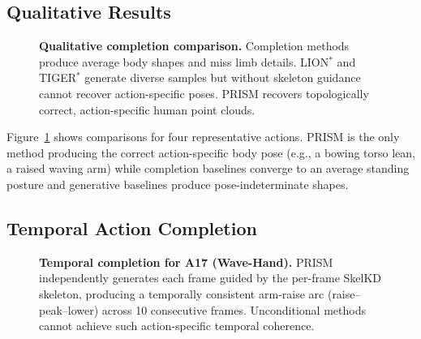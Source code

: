 \documentclass{article}
\begin{document}
\subsection{Qualitative Results}
\label{sec:qual}

\begin{figure}[t]
  \centering
  \caption{
    \textbf{Qualitative completion comparison.}
    Completion methods produce average body shapes and miss limb details.
    LION$^*$ and TIGER$^*$ generate diverse samples but without skeleton
    guidance cannot recover action-specific poses.
    PRISM recovers topologically correct, action-specific human point clouds.
  }
  \label{fig:qual}
\end{figure}

Figure~\ref{fig:qual} shows comparisons for four representative actions.
PRISM is the only method producing the correct action-specific body pose
(e.g., a bowing torso lean, a raised waving arm) while completion baselines
converge to an average standing posture and generative baselines produce
pose-indeterminate shapes.

\subsection{Temporal Action Completion}
\label{sec:temporal}

\begin{figure}[t]
  \centering
  \caption{
    \textbf{Temporal completion for A17 (Wave-Hand).}
    PRISM independently generates each frame guided by the per-frame SkelKD
    skeleton, producing a temporally consistent arm-raise arc (raise--peak--lower)
    across 10 consecutive frames.
    Unconditional methods cannot achieve such action-specific temporal coherence.
  }
  \label{fig:temporal}
\end{figure}
\end{document}

